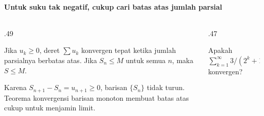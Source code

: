 \documentclass{../../kalkulus-ppt}
\begin{document}
\begin{frame}{\insertsection}
    \framesubtitle{Untuk suku tak negatif, cukup cari batas atas jumlah parsial}
    \begin{columns}[T,onlytextwidth]
        \begin{column}{.49\textwidth}
            \begin{teorema}
                Jika $u_k\ge0$, deret $\sum u_k$ konvergen
                tepat ketika jumlah parsialnya berbatas atas.
                Jika $S_n\le M$ untuk semua $n$, maka $S\le M$.
            \end{teorema}
            Karena $S_{n+1}-S_n=u_{n+1}\ge0$, barisan $\{S_n\}$
            tidak turun. Teorema konvergensi barisan monoton
            membuat batas atas cukup untuk menjamin limit.
        \end{column}
        \begin{column}{.47\textwidth}
            \begin{contoh}
                Apakah $\sum_{k=1}^\infty 3/(2^k+1)$ konvergen?
            \end{contoh}
        \end{column}
    \end{columns}
\end{frame}
\end{document}
